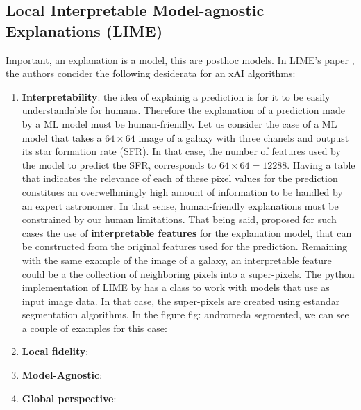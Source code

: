 \subsection{Local Interpretable Model-agnostic Explanations (LIME)}


Important, an explanation is a model, this are posthoc models.
In LIME's paper \citep{ribeiro2016}, the authors concider the following desiderata for an xAI algorithms:

\begin{enumerate}

  \item \textbf{Interpretability}: the idea of explainig a prediction is for it to be easily understandable for humans. Therefore the explanation of a prediction made by a ML model must be human-friendly. Let us consider the case of a ML model that takes a $64 \times 64$ image of a galaxy with three chanels and outpust its star formation rate (SFR). In that case, the number of features used by the model to predict the SFR, corresponds to $64 \times 64 = 12288$. Having a table that indicates the relevance of each of these pixel values for the prediction constitues an overwelhmingly high amount of information to be handled by an expert astronomer. In that sense, human-friendly explanations must be constrained by our human limitations. That being said, \cite{ribeiro2016} proposed for such cases the use of \textbf{interpretable features} for the explanation model, that can be constructed from the original features used for the prediction. Remaining with the same example of the image of a galaxy, an interpretable feature could be a the collection of neighboring pixels into a super-pixels. The python implementation of LIME by \cite{ribeiro2016} has a class to work with models that use as input image data. In that case, the super-pixels are created using estandar segmentation algorithms. In the figure {fig: andromeda segmented}, we can see a couple of examples for this case: 

  \item \textbf{Local fidelity}:

  \item \textbf{Model-Agnostic}:

  \item \textbf{Global perspective}:

\end{enumerate}

